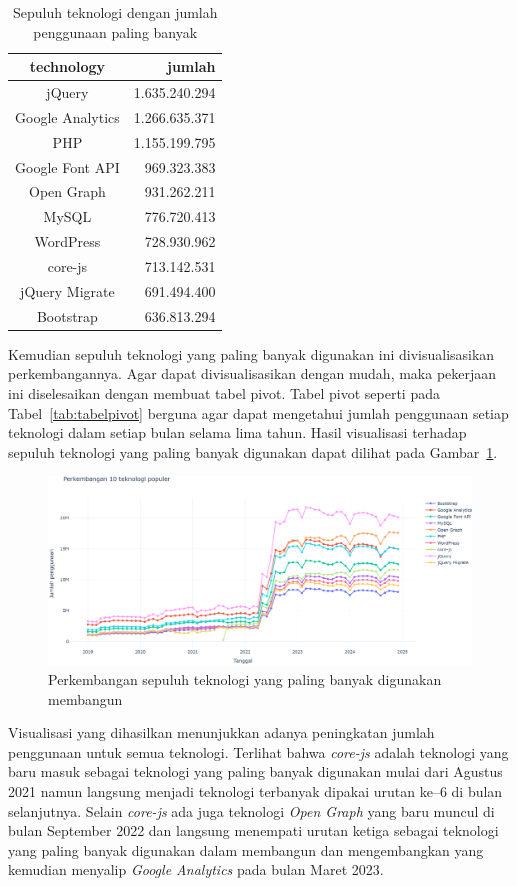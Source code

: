 \begin{table}[H]
\centering
\caption{Sepuluh teknologi dengan jumlah penggunaan paling banyak}
\label{tab:sepuluhteknologipopulerreal}
\begin{tabular}{|c|r|}
\hline
technology & jumlah \\ \hline
jQuery & 1.635.240.294 \\ \hline
Google Analytics & 1.266.635.371 \\ \hline
PHP & 1.155.199.795 \\ \hline
Google Font API & 969.323.383 \\ \hline
Open Graph & 931.262.211 \\ \hline
MySQL & 776.720.413 \\ \hline
WordPress & 728.930.962 \\ \hline
core-js & 713.142.531 \\ \hline
jQuery Migrate & 691.494.400 \\ \hline
Bootstrap & 636.813.294 \\ \hline
\end{tabular}
\end{table}

Kemudian sepuluh teknologi yang paling banyak digunakan ini divisualisasikan perkembangannya. Agar dapat divisualisasikan dengan mudah, maka pekerjaan ini diselesaikan dengan membuat tabel pivot. Tabel pivot seperti pada Tabel~\ref{tab:tabelpivot} berguna agar dapat mengetahui jumlah penggunaan setiap teknologi dalam setiap bulan selama lima tahun. Hasil visualisasi terhadap sepuluh teknologi yang paling banyak digunakan dapat dilihat pada Gambar~\ref{fig:sepuluhteknologireal}.
\begin{figure}[H]
    \centering
    \includegraphics[width=0.7\linewidth]{Gambar/Perkembangan sepuluh real.png}
    \caption{Perkembangan sepuluh teknologi yang paling banyak digunakan membangun \web}
    \label{fig:sepuluhteknologireal}
\end{figure}

Visualisasi yang dihasilkan menunjukkan adanya peningkatan jumlah penggunaan untuk semua teknologi. Terlihat bahwa \textit{core-js} adalah teknologi yang baru masuk sebagai teknologi yang paling banyak digunakan mulai dari Agustus 2021 namun langsung menjadi teknologi terbanyak dipakai urutan ke--6 di bulan selanjutnya. Selain \textit{core-js} ada juga teknologi \textit{Open Graph} yang baru muncul di bulan September 2022 dan langsung menempati urutan ketiga sebagai teknologi yang paling banyak digunakan dalam membangun dan mengembangkan \web yang kemudian menyalip \textit{Google Analytics} pada bulan Maret 2023.

